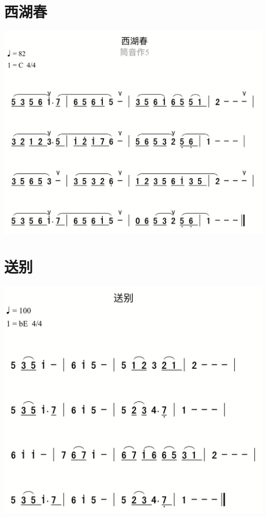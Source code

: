 \documentclass[cn,pad,chinese,chinesefont=nofont]{elegantbook}
\begin{document}
\section{西湖春}          
	\includegraphics[width=\textwidth]{dongxiao/IMG_0860-西湖春.png} 

\section{送别}
    \includegraphics[width=\textwidth]{dongxiao/IMG_0855-送别.png}  
\end{document}
